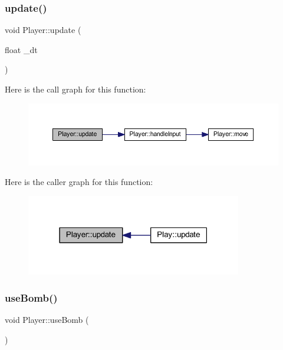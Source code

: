\subsubsection{\texorpdfstring{update()}{update()}}
{\footnotesize\ttfamily void Player\+::update (\begin{DoxyParamCaption}\item[{float}]{\+\_\+dt }\end{DoxyParamCaption})}

Here is the call graph for this function\+:
\nopagebreak
\begin{figure}[H]
\begin{center}
\leavevmode
\includegraphics[width=350pt]{class_player_a71a11d7f337c312add448fe752e55b51_cgraph}
\end{center}
\end{figure}
Here is the caller graph for this function\+:
\nopagebreak
\begin{figure}[H]
\begin{center}
\leavevmode
\includegraphics[width=267pt]{class_player_a71a11d7f337c312add448fe752e55b51_icgraph}
\end{center}
\end{figure}
\mbox{\label{class_player_a1b9e6a1aebb4805e14bdefbb1566fb6d}} 
\subsubsection{\texorpdfstring{use\+Bomb()}{useBomb()}}
{\footnotesize\ttfamily void Player\+::use\+Bomb (\begin{DoxyParamCaption}{ }\end{DoxyParamCaption})}

